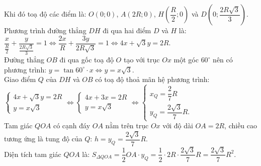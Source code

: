 \begin{bt}
{\begin{enumerate}[a)]
	Khi đó toạ độ các điểm là: $O(0; 0)$, $A(2R; 0)$, $H\left(\dfrac{R}{2}; 0\right)$ và $D\left(0; \dfrac{2R\sqrt{3}}{3}\right)$.\\
	Phương trình đường thẳng $DH$ đi qua hai điểm $D$ và $H$ là:
	$\dfrac{x}{\frac{R}{2}} + \dfrac{y}{\frac{2R\sqrt{3}}{3}} = 1 \Leftrightarrow \dfrac{2x}{R} + \dfrac{3y}{2R\sqrt{3}} = 1 \Leftrightarrow 4x + \sqrt{3}y = 2R$.\\
	Đường thẳng $OB$ đi qua gốc toạ độ $O$ tạo với trục $Ox$ một góc $60^\circ$ nên có phương trình:
	$y = \tan 60^\circ \cdot x \Leftrightarrow y = x\sqrt{3}$.\\
	Giao điểm $Q$ của $DH$ và $OB$ có toạ độ thoả mãn hệ phương trình:
	$\begin{cases} 4x + \sqrt{3}y = 2R \\ y = x\sqrt{3} \end{cases} \Leftrightarrow \begin{cases} 4x + 3x = 2R \\ y = x\sqrt{3} \end{cases} \Leftrightarrow \begin{cases} x_Q = \dfrac{2}{7}R \\ y_Q = \dfrac{2\sqrt{3}}{7}R. \end{cases}$\\
	Tam giác $QOA$ có cạnh đáy $OA$ nằm trên trục $Ox$ với độ dài $OA = 2R$, chiều cao tương ứng là tung độ của $Q$: $h = y_Q = \dfrac{2\sqrt{3}}{7}R$.\\
	Diện tích tam giác $QOA$ là:
	$S_{\Delta QOA} = \dfrac{1}{2} OA \cdot y_Q = \dfrac{1}{2} \cdot 2R \cdot \dfrac{2\sqrt{3}}{7}R = \dfrac{2\sqrt{3}}{7}R^2$.
\end{enumerate}
}
\end{bt}

